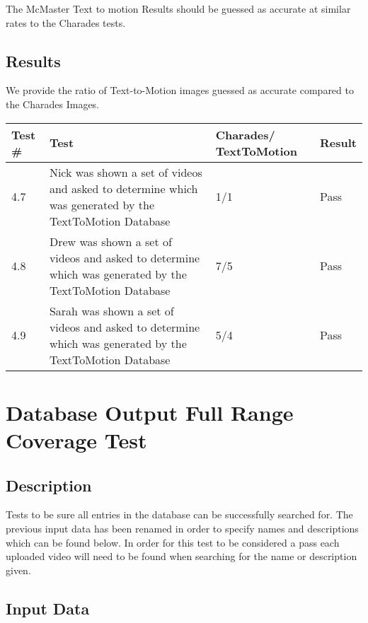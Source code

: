 \documentclass{scrreprt}
\begin{document}
The McMaster Text to motion Results should be guessed as accurate at similar
rates to the Charades tests.

\subsection{Results}

We provide the ratio of Text-to-Motion images guessed as accurate compared to the Charades Images.

\begin{table}[H]
        \centering
        \begin{tabular}{||p{0.75cm}|p{7.5cm}|p{2.5cm}|p{2.5cm}||}
                \hline
                \textbf Test \# & \textbf Test & \textbf Charades/ TextToMotion & \textbf Result\\
                \hline\hline
                4.7 & Nick was shown a set of videos and asked to determine which was generated by the TextToMotion Database &  1/1 & Pass\\
                \hline
                4.8 & Drew was shown a set of videos and asked to determine which was generated by the TextToMotion Database&  7/5  & Pass\\
                \hline
                4.9 & Sarah was shown a set of videos and asked to determine which was generated by the TextToMotion Database& 5/4 & Pass\\
                \hline
        \end{tabular}
\end{table}

\section{Database Output Full Range Coverage Test}
\subsection{Description}

Tests to be sure all entries in the database can be successfully searched for. The previous input data has been renamed in order to specify names and descriptions which can be found below. In order for this test to be considered a pass each uploaded video will need to be found when searching for the name or description given.

\subsection{Input Data}
\end{document}
